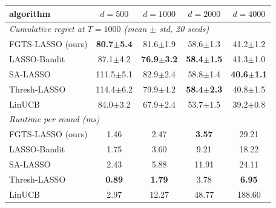 \begin{tabular}{lcccc}
\toprule
algorithm & $d{=}500$ & $d{=}1000$ & $d{=}2000$ & $d{=}4000$ \\
\midrule
\multicolumn{5}{l}{\textit{Cumulative regret at $T{=}1000$ (mean $\pm$ std, 20 seeds)}} \\
FGTS-LASSO (ours) & \textbf{80.7$\pm$5.4} & 81.6$\pm$1.9 & 58.6$\pm$1.3 & 41.2$\pm$1.2 \\
LASSO-Bandit~\cite{bastani2020online} & 87.1$\pm$4.2 & \textbf{76.9$\pm$3.2} & \textbf{58.4$\pm$1.5} & 41.3$\pm$1.0 \\
SA-LASSO~\cite{oh2021sparsity} & 111.5$\pm$5.1 & 82.9$\pm$2.4 & 58.8$\pm$1.4 & \textbf{40.6$\pm$1.1} \\
Thresh-LASSO~\cite{ariu2022thresholded} & 114.4$\pm$6.2 & 79.9$\pm$4.2 & \textbf{58.4$\pm$2.3} & 40.8$\pm$1.5 \\
LinUCB~\cite{chu2011contextual} & 84.0$\pm$3.2 & 67.9$\pm$2.4 & 53.7$\pm$1.5 & 39.2$\pm$0.8 \\
\midrule
\multicolumn{5}{l}{\textit{Runtime per round (ms)}} \\
FGTS-LASSO (ours) & 1.46 & 2.47 & \textbf{3.57} & 29.21 \\
LASSO-Bandit~\cite{bastani2020online} & 1.75 & 3.60 & 9.21 & 18.22 \\
SA-LASSO~\cite{oh2021sparsity} & 2.43 & 5.88 & 11.91 & 24.11 \\
Thresh-LASSO~\cite{ariu2022thresholded} & \textbf{0.89} & \textbf{1.79} & 3.78 & \textbf{6.95} \\
LinUCB~\cite{chu2011contextual} & 2.97 & 12.27 & 48.77 & 188.60 \\
\bottomrule
\end{tabular}